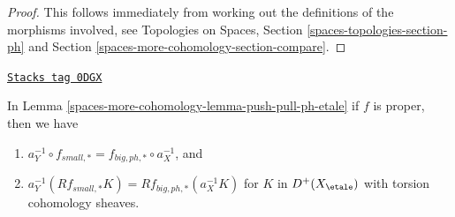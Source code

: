 \begin{proof}
This follows immediately from working out the definitions of the
morphisms involved, see
Topologies on Spaces, Section \ref{spaces-topologies-section-ph}
and Section \ref{spaces-more-cohomology-section-compare}.
\end{proof}

\begin{lemma}
\label{spaces-more-cohomology-lemma-proper-push-pull-ph-etale}
\href{https://stacks.math.columbia.edu/tag/0DGX}{\texttt{Stacks tag 0DGX}}

In Lemma \ref{spaces-more-cohomology-lemma-push-pull-ph-etale} if $f$ is proper, then we have
\begin{enumerate}
\item $a_Y^{-1} \circ f_{small, *} = f_{big, ph, *} \circ a_X^{-1}$, and
\item
$a_Y^{-1}(Rf_{small, *}K) = Rf_{big, ph, *}(a_X^{-1}K)$
for $K$ in $D^+(X_\etale)$ with torsion cohomology sheaves.
\end{enumerate}
\end{lemma}

